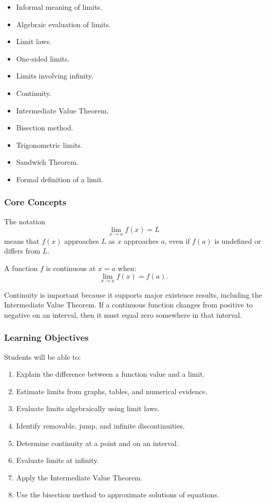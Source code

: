 \documentclass[11pt]{article}
\begin{document}
\begin{itemize}
    \item Informal meaning of limits.
    \item Algebraic evaluation of limits.
    \item Limit laws.
    \item One-sided limits.
    \item Limits involving infinity.
    \item Continuity.
    \item Intermediate Value Theorem.
    \item Bisection method.
    \item Trigonometric limits.
    \item Sandwich Theorem.
    \item Formal definition of a limit.
\end{itemize}

\subsubsection*{Core Concepts}

The notation
\[
\lim_{x\to a}f(x)=L
\]
means that \(f(x)\) approaches \(L\) as \(x\) approaches \(a\), even if \(f(a)\) is undefined or differs from \(L\).

A function \(f\) is continuous at \(x=a\) when:
\[
\lim_{x\to a}f(x)=f(a).
\]

Continuity is important because it supports major existence results, including the Intermediate Value Theorem. If a continuous function changes from positive to negative on an interval, then it must equal zero somewhere in that interval.

\subsubsection*{Learning Objectives}

Students will be able to:

\begin{enumerate}[label=\arabic*.]
    \item Explain the difference between a function value and a limit.
    \item Estimate limits from graphs, tables, and numerical evidence.
    \item Evaluate limits algebraically using limit laws.
    \item Identify removable, jump, and infinite discontinuities.
    \item Determine continuity at a point and on an interval.
    \item Evaluate limits at infinity.
    \item Apply the Intermediate Value Theorem.
    \item Use the bisection method to approximate solutions of equations.
\end{enumerate}
\end{document}
